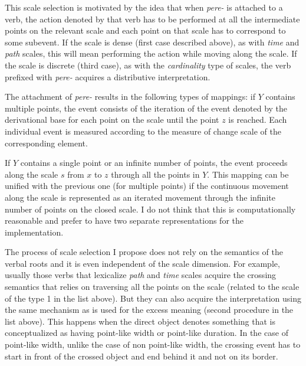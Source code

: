 
This scale selection is motivated by the idea that when \textit{pere-} is attached to a verb, the action denoted by that verb has to be performed at all the intermediate points on the relevant scale and each point on that scale has to correspond to some subevent. If the scale is dense (first case described above), as with \textit{time} and \textit{path} scales, this will mean performing the action while moving along the scale. If the scale is discrete (third case), as with the \textit{cardinality} type of scales, the verb prefixed with \textit{pere-} acquires a distributive interpretation. 

The attachment of \textit{pere-} results in the following types of mappings: %
if $Y$ contains multiple points, the event consists of the iteration of the event denoted by the derivational base for each point on the scale until the point $z$ is reached. Each individual event is measured according to the measure of change scale of the corresponding element.

If $Y$ contains a single point or an infinite number of points, the event proceeds along the scale $s$ from $x$ to $z$ through all the points in $Y$. This mapping can be unified with the previous one (for multiple points) if the continuous movement along the scale is represented as an iterated movement through the infinite number of points on the closed scale. I do not think that this is computationally reasonable and prefer to have two separate representations for the implementation.

The process of scale selection I propose does not rely on the semantics of the verbal roots and it is even independent of the scale dimension. For example, usually those verbs that lexicalize \textit{path} and \textit{time} scales acquire the crossing semantics that relies on traversing all the points on the scale (related to the scale of the type 1 in the list above). But they can also acquire the interpretation using the same mechanism as is used for the excess meaning (second procedure in the list above). This happens when the direct object denotes something that is conceptualized as having point-like width or point-like duration. In the case of point-like width, unlike the case of non point-like width, the crossing event has to start in front of the crossed object and end behind it and not on its border.

